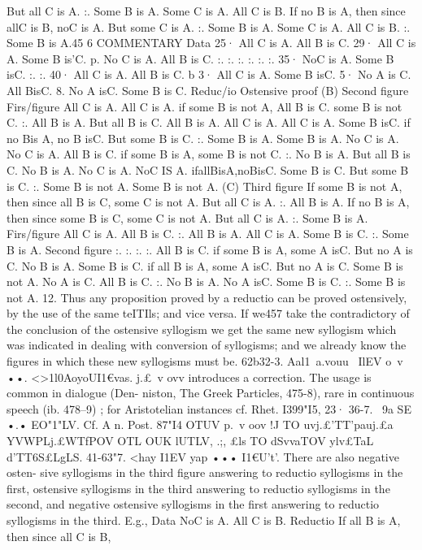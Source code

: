 But all C is A.
:. Some B is A.
Some C is A.
All C is B.
If no B is A, then since
allC is B, noC is A.
But some C is A.
:. Some B is A.
Some C is A.
All C is B.
:. Some B is A.45 6
COMMENTARY
Data
25· All C is A.
All B is C.
29· All C is A.
Some B is'C.
p. No C is A.
All B is C.
:.
:.
:.
:.
:.
:.
35·
NoC is A.
Some B isC.
:.
:.
40· All C is A.
All B is C.
b 3· All C is A.
Some B isC.
5· No A is C.
All BisC.
8. No A isC.
Some B is C.
Reduc/io
Ostensive proof
(B) Second figure
Firs/figure
All C is A.
All C is A.
if some B is not A,
All B is C.
some B is not C.
:. All B is A.
But all B is C.
All B is A.
All C is A.
All C is A.
Some B isC.
if no Bis A, no B isC.
But some B is C.
:. Some B is A.
Some B is A.
No C is A.
No C is A.
All B is C.
if some B is A, some
B is not C.
:. No B is A.
But all B is C.
No B is A.
No C is A.
NoC IS A.
ifallBisA,noBisC.
Some B is C.
But some B is C.
:. Some B is not A.
Some B is not A.
(C) Third figure
If some B is not A,
then since all B is C,
some C is not A.
But all C is A.
:. All B is A.
If no B is A, then since
some B is C, some C
is not A.
But all C is A.
:. Some B is A.
Firs/figure
All C is A.
All B is C.
:. All B is A.
All C is A.
Some B is C.
:. Some B is A.
Second figure
:.
:.
:.
:.
All B is C.
if some B is A, some
A isC.
But no A is C.
No B is A.
Some B is C.
if all B is A, some A
isC.
But no A is C.
Some B is not A.
No A is C.
All B is C.
:. No B is A.
No A isC.
Some B is C.
:. Some B is not A.
12. Thus any proposition proved by a reductio can be proved
ostensively, by the use of the same teITIls; and vice versa. If we457
take the contradictory of the conclusion of the ostensive syllogism
we get the same new syllogism which was indicated in dealing
with conversion of syllogisms; and we already know the figures
in which these new syllogisms must be.
62b32-3. Aal1~a.vouu~ IlEV o~v ••. <>1l0AoyoUI1€vas.
j.£~v ovv
introduces a correction. The usage is common in dialogue (Den-
niston, The Greek Particles, 475-8), rare in continuous speech (ib.
478--9) ; for Aristotelian instances cf. Rhet. I399"I5, 23·
36-7. ~9a SE •.• EO"1"LV. Cf. A n. Post. 87"I4 OTUV p.~v oov !J TO
uvj.£'TT'pauj.£a YVWPLj.£WTfPOV OTL OUK lUTLV, .;, £ls TO dSvvaTOV ylv£TaL
d'TT6S£LgLS.
41-63"7. <hay I1EV yap ••• I1€U't'. There are also negative osten-
sive syllogisms in the third figure answering to reductio syllogisms
in the first, ostensive syllogisms in the third answering to reductio
syllogisms in the second, and negative ostensive syllogisms in the
first answering to reductio syllogisms in the third. E.g.,
Data
NoC is A.
All C is B.
Reductio
If all B is A, then since all C is B,
